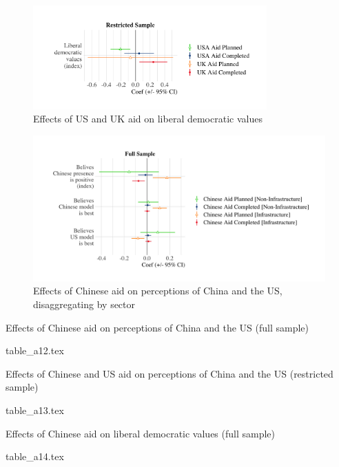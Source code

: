 \documentclass[9pt]{article}
\begin{document}
\begin{figure}[H]
\centering
\caption{Effects of US and UK aid on liberal democratic values}
\includegraphics[width=0.8\textwidth]{figures/figure_a18.png} %
\end{figure}

\begin{figure}[H]
\centering
\caption{Effects of Chinese aid on perceptions of China and the US, disaggregating by sector}
\includegraphics[width=1\textwidth]{figures/figure_a19.png} %
\end{figure}

\setlength{\tabcolsep}{5pt}
\begin{table}[H]
\caption{Effects of Chinese aid on perceptions of China and the US (full sample)}
\label{reg}
\centering
{table_a12.tex} %
\end{table}

\setlength{\tabcolsep}{5pt}
\begin{table}[H]
\caption{Effects of Chinese and US aid on perceptions of China and the US (restricted sample)}
\label{reg}
\centering
{table_a13.tex} %
\end{table}

\setlength{\tabcolsep}{5pt}
\begin{table}[H]
\caption{Effects of Chinese aid on liberal democratic values (full sample)}
\label{reg}
\centering
{table_a14.tex} %
\end{table}
\end{document}
